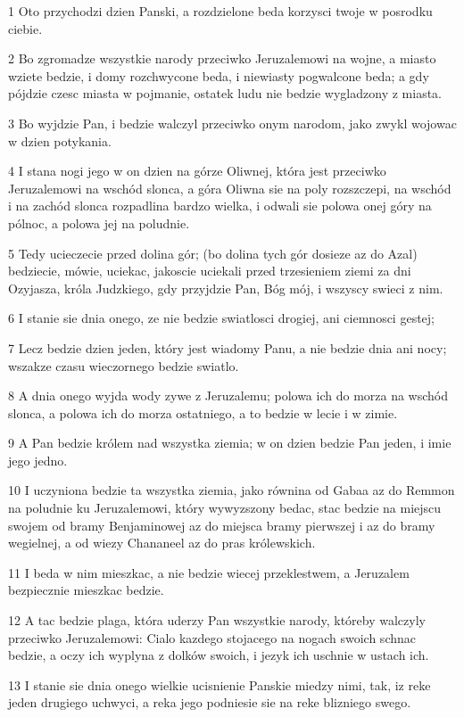 \par 1 Oto przychodzi dzien Panski, a rozdzielone beda korzysci twoje w posrodku ciebie.
\par 2 Bo zgromadze wszystkie narody przeciwko Jeruzalemowi na wojne, a miasto wziete bedzie, i domy rozchwycone beda, i niewiasty pogwalcone beda; a gdy pójdzie czesc miasta w pojmanie, ostatek ludu nie bedzie wygladzony z miasta.
\par 3 Bo wyjdzie Pan, i bedzie walczyl przeciwko onym narodom, jako zwykl wojowac w dzien potykania.
\par 4 I stana nogi jego w on dzien na górze Oliwnej, która jest przeciwko Jeruzalemowi na wschód slonca, a góra Oliwna sie na poly rozszczepi, na wschód i na zachód slonca rozpadlina bardzo wielka, i odwali sie polowa onej góry na pólnoc, a polowa jej na poludnie.
\par 5 Tedy ucieczecie przed dolina gór; (bo dolina tych gór dosieze az do Azal) bedziecie, mówie, uciekac, jakoscie uciekali przed trzesieniem ziemi za dni Ozyjasza, króla Judzkiego, gdy przyjdzie Pan, Bóg mój, i wszyscy swieci z nim.
\par 6 I stanie sie dnia onego, ze nie bedzie swiatlosci drogiej, ani ciemnosci gestej;
\par 7 Lecz bedzie dzien jeden, który jest wiadomy Panu, a nie bedzie dnia ani nocy; wszakze czasu wieczornego bedzie swiatlo.
\par 8 A dnia onego wyjda wody zywe z Jeruzalemu; polowa ich do morza na wschód slonca, a polowa ich do morza ostatniego, a to bedzie w lecie i w zimie.
\par 9 A Pan bedzie królem nad wszystka ziemia; w on dzien bedzie Pan jeden, i imie jego jedno.
\par 10 I uczyniona bedzie ta wszystka ziemia, jako równina od Gabaa az do Remmon na poludnie ku Jeruzalemowi, który wywyzszony bedac, stac bedzie na miejscu swojem od bramy Benjaminowej az do miejsca bramy pierwszej i az do bramy wegielnej, a od wiezy Chananeel az do pras królewskich.
\par 11 I beda w nim mieszkac, a nie bedzie wiecej przeklestwem, a Jeruzalem bezpiecznie mieszkac bedzie.
\par 12 A tac bedzie plaga, która uderzy Pan wszystkie narody, któreby walczyly przeciwko Jeruzalemowi: Cialo kazdego stojacego na nogach swoich schnac bedzie, a oczy ich wyplyna z dolków swoich, i jezyk ich uschnie w ustach ich.
\par 13 I stanie sie dnia onego wielkie ucisnienie Panskie miedzy nimi, tak, iz reke jeden drugiego uchwyci, a reka jego podniesie sie na reke blizniego swego.
